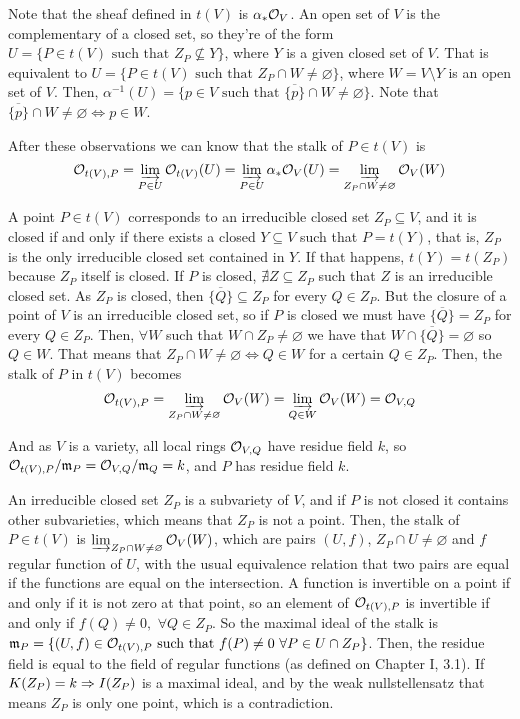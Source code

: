 \begin{sol}
	\begin{enumerate}[label=\alph*)]
		Note that the sheaf defined in $t(V)$ is $\alpha_*\mathcal{O}_V$. An open set of $V$ is the complementary of a closed set, so they're of the form $U = \{P \in t(V) \text{ such that } Z_P \not\subseteq Y \}$, where $Y$ is a given closed set of $V$. That is equivalent to $U = \{P \in t(V) \text{ such that } Z_P \cap W \neq \varnothing \}$, where $W = V \setminus Y$ is an open set of $V$. Then, $\alpha^{-1}(U) = \{p \in V \text{ such that } \overline{\{p\}} \cap W \neq \varnothing \}$. Note that $\overline{\{p\}} \cap W \neq \varnothing \iff p \in W$. 

		After these observations we can know that the stalk of $P \in t(V)$ is 
		\[
			\mathcal{O}_{t(V),P} = \varinjlim_{P \in U} \mathcal{O}_{t(V)}(U) = \varinjlim_{P \in U} \alpha_* \mathcal{O}_{V}(U) = \varinjlim_{Z_P \cap W \neq \varnothing} \mathcal{O}_{V}(W)
		\]


		A point $P \in t(V)$ corresponds to an irreducible closed set $Z_P \subseteq V$, and it is closed if and only if there exists a closed $Y \subseteq V$ such that $P = t(Y)$, that is, $Z_P$ is the only irreducible closed set contained in $Y$. If that happens, $t(Y) = t(Z_P)$ because $Z_P$ itself is closed. If $P$ is closed, $\nexists Z \subseteq Z_P$ such that $Z$ is an irreducible closed set. As $Z_P$ is closed, then $\overline{\{Q\}} \subseteq Z_P$ for every $Q \in Z_P$. But the closure of a point of $V$ is an irreducible closed set, so if $P$ is closed we must have $\overline{\{Q\}} = Z_P$ for every $Q \in Z_P$. Then, $\forall W$ such that $W \cap Z_P \neq \varnothing$ we have that $W \cap \overline{\{Q\}} = \varnothing$ so $Q \in W$. That means that $Z_P \cap W \neq \varnothing \iff Q \in W$ for a certain $Q \in Z_P$. Then, the stalk of $P$ in $t(V)$ becomes 
		\[
			\mathcal{O}_{t(V),P} = \varinjlim_{Z_P \cap W \neq \varnothing} \mathcal{O}_{V}(W) = \varinjlim_{Q \in W} \mathcal{O}_{V}(W) = \mathcal{O}_{V,Q}
		\]

		And as $V$ is a variety, all local rings $\mathcal{O}_{V,Q}$ have residue field $k$, so $\mathcal{O}_{t(V),P} / \mathfrak{m}_P = \mathcal{O}_{V,Q}/\mathfrak{m}_Q = k$, and $P$ has residue field $k$.

		An irreducible closed set $Z_P$ is a subvariety of $V$, and if $P$ is not closed it contains other subvarieties, which means that $Z_P$ is not a point. Then, the stalk of $P \in t(V)$ is $\varinjlim_{Z_P \cap W \neq \varnothing} \mathcal{O}_{V}(W)$, which are pairs $(U,f)$, $Z_P \cap U \neq \varnothing$ and $f$ regular function of $U$, with the usual equivalence relation that two pairs are equal if the functions are equal on the intersection. A function is invertible on a point if and only if it is not zero at that point, so an element of $\mathcal{O}_{t(V),P}$ is invertible if and only if $f(Q) \neq 0, \, \, \forall Q \in Z_P$. So the maximal ideal of the stalk is $\mathfrak{m}_P =  \{(U,f) \in \mathcal{O}_{t(V),P} \text{ such that } f(P) \neq 0 \, \, \forall P \in U \cap Z_P \}$. Then, the residue field is equal to the field of regular functions (as defined on Chapter I, 3.1). If $K(Z_P) = k \Rightarrow I(Z_P)$ is a maximal ideal, and by the weak nullstellensatz that means $Z_P$ is only one point, which is a contradiction.


\end{enumerate}
\end{sol}
